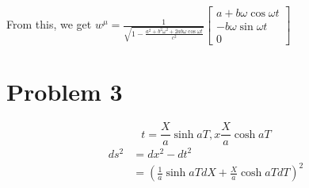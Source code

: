 \documentclass[12pt]{article}
\begin{document}
From this, we get $w^\mu=\frac{1}{\sqrt{1-\frac{a^2 +b^2\omega^2 + 2ab\omega\cos\omega t}{c^2}}}\begin{bmatrix}

a+b\omega\cos\omega t\\
-b\omega\sin\omega t\\
0
\end{bmatrix}$

\section*{Problem 3}
$$t=\frac{X}{a}\sinh aT, x\frac{X}{a}\cosh a T$$
\begin{align*}
ds^2&=dx^2-dt^2\\
&= (\frac1{a}\sinh aTdX + \frac{X}{a}\cosh aT dT)^2
\end{align*}
\end{document}
